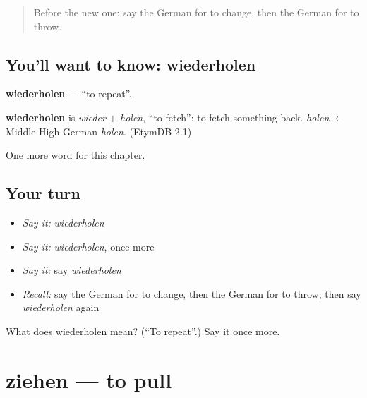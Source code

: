 \label{lesson:GE-C153-wiederholen}



\begin{quote}
Before the new one: say the German for to change, then the German for to throw.
\end{quote}

\subsection*{You'll want to know: wiederholen}
\textbf{wiederholen} — \textquotedblleft{}to repeat\textquotedblright{}.

\begin{cousinweb}
\textbf{wiederholen} is \emph{wieder} + \emph{holen}, \textquotedblleft{}to fetch\textquotedblright{}: to fetch something back. \emph{holen} $\leftarrow$ Middle High German \emph{holen}. (EtymDB 2.1)
\end{cousinweb}

\begin{grammarlens}[title={What you've built}]
One more word for this chapter.
\end{grammarlens}

\subsection*{Your turn}
\begin{itemize}
\raggedright
  \item \emph{Say it:} \emph{wiederholen}
  \item \emph{Say it:} \emph{wiederholen}, once more
  \item \emph{Say it:} say \emph{wiederholen}
  \item \emph{Recall:} say the German for to change, then the German for to throw, then say \emph{wiederholen} again
\end{itemize}

\begin{tcolorbox}[breakable,colback=teal!4,colframe=teal!35!black,title={Before you move on}]
What does wiederholen mean? (\textquotedblleft{}To repeat\textquotedblright{}.) Say it once more.
\end{tcolorbox}
\section[ziehen]{ziehen — to pull}

\label{lesson:GE-C153-ziehen}



